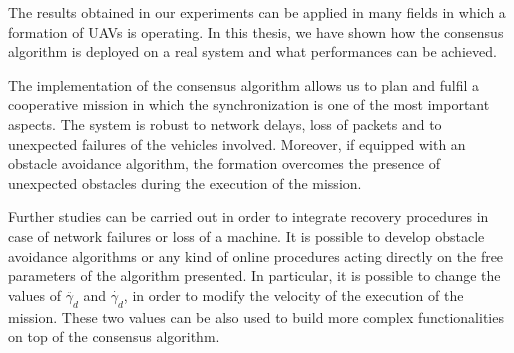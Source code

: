 
The results obtained in our experiments can be applied in many fields in which
a formation of UAVs is operating.
In this thesis, we have shown how the consensus algorithm is deployed on a real
system and what performances can be achieved.

The implementation of the consensus algorithm allows us to plan and fulfil a cooperative
mission in which the synchronization is one of the most important aspects.
The system is robust to network delays, loss of packets and to unexpected failures
of the vehicles involved.
Moreover, if equipped with an obstacle avoidance algorithm, the formation
overcomes the presence of unexpected obstacles during the execution of the mission.

Further studies can be carried out in order to integrate recovery procedures in case
of network failures or loss of a machine.
It is possible to develop obstacle avoidance algorithms or any kind of online procedures
acting directly on the free parameters of the algorithm presented.
In particular, it is possible to change the values of $\ddot{\gamma_d}$ and $\dot{\gamma_d}$,
in order to modify the velocity of the execution of the mission. These two values
can be also used to build more complex functionalities on top of the consensus algorithm.

